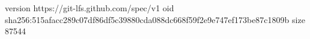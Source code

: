 version https://git-lfs.github.com/spec/v1
oid sha256:515afacc289c07df86df5c39880cda088dc668f59f2e9e747ef173be87c1809b
size 87544
